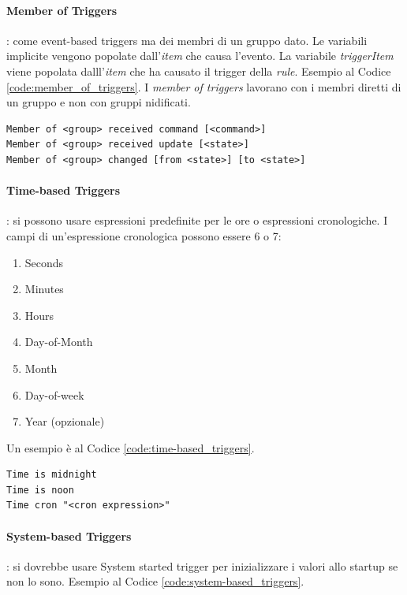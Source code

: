 \paragraph{Member of Triggers}: come event-based triggers ma dei membri di un gruppo dato. Le variabili implicite vengono popolate dall'{\em item} che causa l'evento. La variabile {\em triggerItem} viene popolata dalll'{\em item} che ha causato il trigger della {\em rule}. Esempio al Codice \ref{code:member_of_triggers}. I {\em member of triggers} lavorano con i membri diretti di un gruppo e non con gruppi nidificati.

\begin{lstlisting}[caption=Member of Triggers,label=code:member_of_triggers]
Member of <group> received command [<command>]
Member of <group> received update [<state>]
Member of <group> changed [from <state>] [to <state>]
\end{lstlisting}

\paragraph{Time-based Triggers}: si possono usare espressioni predefinite per le ore o espressioni cronologiche. I campi di un'espressione cronologica possono essere 6 o 7:
\begin{enumerate}
    \item Seconds
    \item Minutes
    \item Hours
    \item Day-of-Month
    \item Month
    \item Day-of-week
    \item Year (opzionale)
\end{enumerate}
Un esempio è al Codice \ref{code:time-based_triggers}.

\begin{lstlisting}[caption=Time-based Triggers,label=code:time-based_triggers]
Time is midnight
Time is noon
Time cron "<cron expression>"
\end{lstlisting}

\paragraph{System-based Triggers}: si dovrebbe usare System started trigger per inizializzare i valori allo startup se non lo sono. Esempio al Codice \ref{code:system-based_triggers}.

